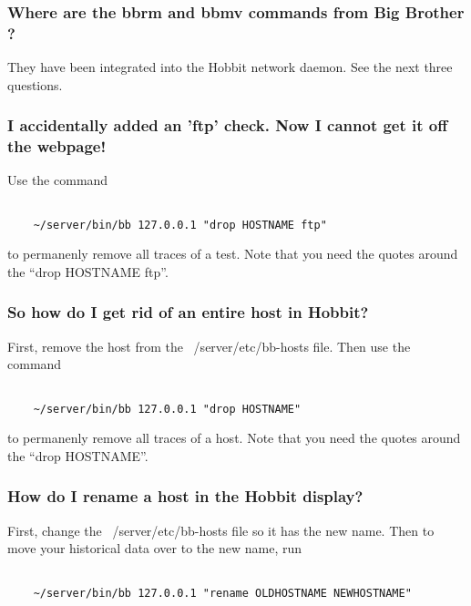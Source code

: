 \subsubsection{Where are the bbrm and bbmv commands from Big Brother ?}


 They have been integrated into the Hobbit network daemon. See the next three questions.
 
\subsubsection{I accidentally added an 'ftp' check. Now I cannot get it off the webpage!}


 Use the command
\begin{verbatim}

    ~/server/bin/bb 127.0.0.1 "drop HOSTNAME ftp"

\end{verbatim}


 to permanenly remove all traces of a test. Note that you need the quotes around the ``drop HOSTNAME ftp''.
 
\subsubsection{So how do I get rid of an entire host in Hobbit?}


 First, remove the host from the ~/server/etc/bb-hosts file. Then use the command
\begin{verbatim}

    ~/server/bin/bb 127.0.0.1 "drop HOSTNAME"

\end{verbatim}


 to permanenly remove all traces of a host. Note that you need the quotes around the ``drop HOSTNAME''.
 
\subsubsection{How do I rename a host in the Hobbit display?}


 First, change the ~/server/etc/bb-hosts file so it has the new name. Then to move your historical data over to the new name, run
\begin{verbatim}

    ~/server/bin/bb 127.0.0.1 "rename OLDHOSTNAME NEWHOSTNAME"

\end{verbatim}
 
